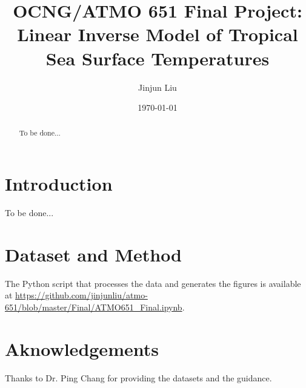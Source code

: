 \documentclass[12pt,a4paper]{article}
\title{\huge{\textbf{OCNG/ATMO 651 Final Project: Linear Inverse Model of Tropical Sea Surface Temperatures}}}
\author{Jinjun Liu}
\date{\today}
\begin{document}
\maketitle
\thispagestyle{empty}
\begin{abstract}

    To be done...

\end{abstract}

\tableofcontents

\clearpage %

\section{Introduction} %

    To be done...

\section{Dataset and Method}\label{dataset-method}

The Python script that processes the data and generates the figures is available at \url{https://github.com/jinjunliu/atmo-651/blob/master/Final/ATMO651\_Final.ipynb}.

\section{Aknowledgements}

Thanks to Dr. Ping Chang for providing the datasets and the guidance.
\end{document}

